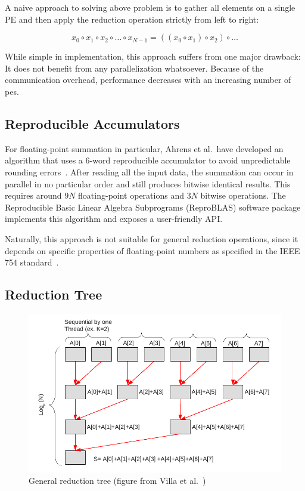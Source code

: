 A naive approach to solving above problem is to gather all elements on a single PE and then apply the reduction operation strictly from left to right:

\begin{equation}
x_0 \circ x_1 \circ x_2 \circ \ldots  \circ x_{N-1} = ((x_0 \circ x_1) \circ x_2) \circ \ldots
\end{equation}

While simple in implementation, this approach suffers from one major drawback:
It does not benefit from any parallelization whatsoever.
Because of the communication overhead, performance decreases with an increasing number of \glspl{pe}.


\subsection{Reproducible Accumulators}
\label{sec:Reproducible Accumulators}
For floating-point summation in particular, Ahrens et al.\ have developed an algorithm that uses a 6-word reproducible accumulator to avoid unpredictable rounding errors~\cite{ahrens_algorithms_2020}.
After reading all the input data, the summation can occur in parallel in no particular order and still produces bitwise identical results.
This requires around $9N$ floating-point operations and $3N$ bitwise operations.
The Reproducible Basic Linear Algebra Subprograms (ReproBLAS) software package implements this algorithm and exposes a user-friendly API.\@

Naturally, this approach is not suitable for general reduction operations, since it depends on specific properties of floating-point numbers as specified in the IEEE 754 standard~\cite{noauthor_ieee_nodate-1}.


\subsection{Reduction Tree}
\label{sec:ReductionTree}

\begin{figure}[H]
\centering
\includegraphics[scale=0.7]{figures/villa_et_al_reduction_tree.pdf}
\caption{General reduction tree (figure from Villa et al.\ \cite{villa_effects_2009})}
\label{fig:villa_reduction_tree}
\end{figure}


